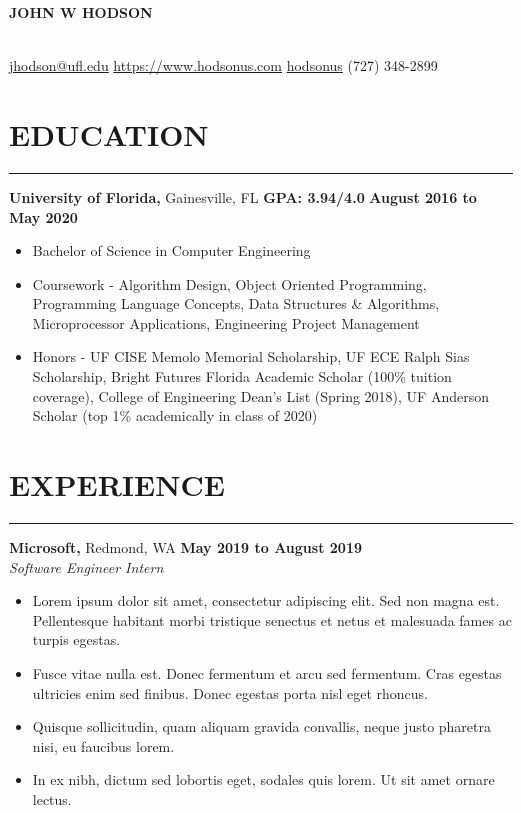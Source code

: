\documentclass[11pt]{article} %
\begin{document}
	
	\noindent\centerline{ \huge\textbf{JOHN W HODSON}}\\
	
	\noindent \faEnvelopeSquare \space\href{mailto:jhodson@ufl.edu}{jhodson@ufl.edu} \hspace*{\fill} \faHome \space \href{https://www.hodsonus.com}{https://www.hodsonus.com} \hspace*{\fill} \faGithub \space \href{https://github.com/hodsonus}{hodsonus} \hspace*{\fill} \faMobilePhone \space (727) 348-2899\\
	
	\section*{EDUCATION}
		\hrule \relax
		\vspace{.4cm}
		
		\noindent \textbf{University of Florida,} Gainesville, FL
		\hfill\textbf{GPA: 3.94/4.0}
		\hfill\textbf{August 2016 to May 2020}
		
		\begin{itemize}[noitemsep,nolistsep, label = {-}]
			\item  Bachelor of Science in Computer Engineering
			\item  Coursework - Algorithm Design, Object Oriented Programming, Programming Language Concepts, Data Structures \& Algorithms, Microprocessor Applications, Engineering Project Management
			\item  Honors - UF CISE Memolo Memorial Scholarship, UF ECE Ralph Sias Scholarship, Bright Futures Florida Academic Scholar (100\% tuition coverage), College of Engineering Dean\rq s List (Spring 2018), UF Anderson Scholar (top 1\% academically in class of 2020)
		\end{itemize}
		
		\vspace{.1cm}
	
	\section*{EXPERIENCE}
		\hrule \relax
		\vspace{.4cm}
		
		\noindent \textbf{Microsoft,} Redmond, WA \hfill\textbf{May 2019 to August 2019}\\
		\textit{Software Engineer Intern}
		\begin{itemize}[noitemsep,nolistsep, label = {-}]
			\item Lorem ipsum dolor sit amet, consectetur adipiscing elit. Sed non magna est. Pellentesque habitant morbi tristique senectus et netus et malesuada fames ac turpis egestas.
			\item Fusce vitae nulla est. Donec fermentum et arcu sed fermentum. Cras egestas ultricies enim sed finibus. Donec egestas porta nisl eget rhoncus. 
			\item Quisque sollicitudin, quam aliquam gravida convallis, neque justo pharetra nisi, eu faucibus lorem.
			\item In ex nibh, dictum sed lobortis eget, sodales quis lorem. Ut sit amet ornare lectus.
		\end{itemize}
	
\end{document}
